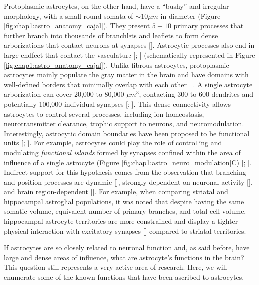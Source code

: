 Protoplasmic astrocytes, on the other hand, have a “bushy” and irregular morphology, with a small round somata of $\sim 10 \mu m$ in diameter (Figure \ref{fig:chap1:astro_anatomy_cajal}). 
They present $5-10$ primary processes that further branch into thousands of branchlets and leaflets to form dense arborizations that contact neurons at synapses [\cite{bushong2002}]. 
Astrocytic processes also end in large endfeet that contact the vasculature [\cite{nagelhus2013}; \cite{verkhratsky2015}] (schematically represented in Figure \ref{fig:chap1:astro_anatomy_cajal}). 
Unlike fibrous astrocytes, protoplasmic astrocytes mainly populate the gray matter in the brain and have domains with well-defined borders that minimally overlap with each other [\cite{bushong2002}].
A single astrocyte arborization can cover 20,000 to 80,000 $\mu m^3$, contacting 300 to 600 dendrites and potentially 100,000 individual synapses [\cite{bushong2002}; \cite{halassa2007}].
This dense connectivity allows astrocytes to control several processes, including ion homeostasis, neurotransmitter clearance, trophic support to neurons, and neuromodulation.
Interestingly, astrocytic domain boundaries have been proposed to be functional units [\cite{perea2014}; \cite{fellin2009}].
For example, astrocytes could play the role of controlling and modulating \textit{functional islands} formed by synapses confined within the area of influence of a single astrocyte (Figure \ref{fig:chap1:astro_neuro_modulation}C) [\cite{halassa2007}; \cite{fellin2009}].
Indirect support for this hypothesis comes from the observation that branching and position processes are dynamic [\cite{kacerovsky2016stargazing}], strongly dependent on neuronal activity [\cite{genoud2006plasticity}], and brain region-dependent [\cite{chai2017}].   
For example, when comparing striatal and hippocampal astroglial populations, it was noted that despite having the same somatic volume, equivalent number of primary branches, and total cell volume, hippocampal astrocyte territories are more constrained and display a tighter physical interaction with excitatory synapses [\cite{chai2017}] compared to striatal territories.

If astrocytes are so closely related to neuronal function and, as said before, have large and dense areas of influence, what are astrocyte's functions in the brain? 
This question still represents a very active area of research. 
Here, we will enumerate some of the known functions that have been ascribed to astrocytes. 

